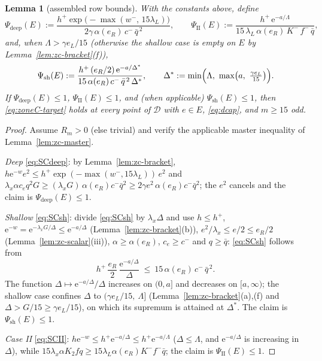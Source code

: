 \documentclass[11pt]{article}
\newtheorem{lemma}[theorem]{Lemma}
\theoremstyle{remark}
\theoremstyle{plain}
\theoremstyle{plain}
\newcommand{\eu}{\mathrm{e}}
\newcommand{\D}{\mathcal D}
\begin{document}
\begin{lemma}[assembled row bounds]\label{lem:zc-rows}
With the constants above, define
\[
 \Psi_{\mathrm{deep}}(E):=
 \frac{h^+\exp\bigl(-\max(w^-,\,15\lambda_L)\bigr)}
      {2\gamma\,\alpha(e_R)\,c^-\,\bar q^{\,2}},
 \qquad
 \Psi_{\mathrm{II}}(E):=
 \frac{h^+\,\eu^{-a/\Lambda}}
      {15\,\lambda_L\,\alpha(e_R)\,K^-\,f^-\,\bar q},
\]
and, when $\Lambda>\gamma e_L/15$ (otherwise the shallow case is empty
on $E$ by Lemma~\ref{lem:zc-bracket}(f)),
\[
 \Psi_{\mathrm{sh}}(E):=
 \frac{h^+\,(e_R/2)\,\eu^{-a/\Delta^*}}
      {15\,\alpha(e_R)\,c^-\,\bar q^{\,2}\,\Delta^*},
 \qquad
 \Delta^*:=\min\Bigl(\Lambda,\ \max\bigl(a,\ \tfrac{\gamma e_L}{15}\bigr)\Bigr).
\]
If $\Psi_{\mathrm{deep}}(E)\le1$, $\Psi_{\mathrm{II}}(E)\le1$, and (when
applicable) $\Psi_{\mathrm{sh}}(E)\le1$, then \eqref{eq:zoneC-target} holds at
every point of $\D$ with $e\in E$, \eqref{eq:dcap}, and $m\ge15$ odd.
\end{lemma}

\begin{proof}
Assume $R_m>0$ (else trivial) and verify the applicable master inequality of
Lemma~\ref{lem:zc-master}.

\emph{Deep} \eqref{eq:SCdeep}: by Lemma~\ref{lem:zc-bracket},
$h\eu^{-w}e^2\le h^+\exp(-\max(w^-,15\lambda_L))\,e^2$ and
$\lambda_x\alpha c_eq^2G
\ge(\lambda_xG)\,\alpha(e_R)c^-\bar q^2
\ge2\gamma e^2\,\alpha(e_R)c^-\bar q^2$; the $e^2$ cancels and the claim is
$\Psi_{\mathrm{deep}}(E)\le1$.

\emph{Shallow} \eqref{eq:SCsh}: divide \eqref{eq:SCsh} by
$\lambda_x\Delta$ and use $h\le h^+$,
$\eu^{-w}=\eu^{-\lambda_xG/\Delta}\le\eu^{-a/\Delta}$
(Lemma~\ref{lem:zc-bracket}(b)), $e^2/\lambda_x\le e/2\le e_R/2$
(Lemma~\ref{lem:zc-scalar}(iii)), $\alpha\ge\alpha(e_R)$, $c_e\ge c^-$ and
$q\ge\bar q$: \eqref{eq:SCsh} follows from
\[
 h^+\,\frac{e_R}2\,\frac{\eu^{-a/\Delta}}{\Delta}
 \ \le\ 15\,\alpha(e_R)\,c^-\,\bar q^{\,2}.
\]
The function $\Delta\mapsto\eu^{-a/\Delta}/\Delta$ increases on $(0,a]$ and
decreases on $[a,\infty)$; the shallow case confines $\Delta$ to
$(\gamma e_L/15,\ \Lambda]$ (Lemma~\ref{lem:zc-bracket}(a),(f) and
$\Delta>G/15\ge\gamma e_L/15$), on which its supremum is attained at
$\Delta^*$.  The claim is $\Psi_{\mathrm{sh}}(E)\le1$.

\emph{Case II} \eqref{eq:SCII}: $h\eu^{-w}\le h^+\eu^{-a/\Delta}\le
h^+\eu^{-a/\Lambda}$ ($\Delta\le\Lambda$, and $\eu^{-a/\Delta}$ is
increasing in $\Delta$), while
$15\lambda_x\alpha K_2fq\ge15\lambda_L\alpha(e_R)K^-f^-\bar q$; the claim is
$\Psi_{\mathrm{II}}(E)\le1$.
\end{proof}
\end{document}
